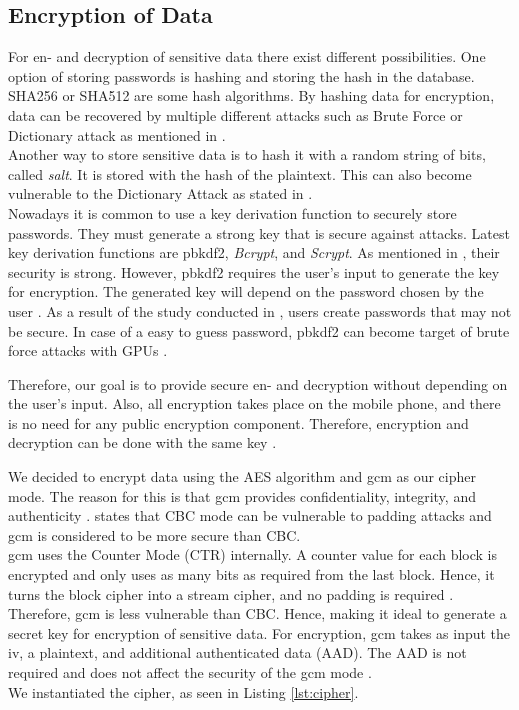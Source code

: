\subsection{Encryption of Data}\label{arch_encryption}
For en- and decryption of sensitive data there exist different possibilities. One option of storing passwords is hashing and storing the hash in the database. SHA256 or SHA512 are some hash algorithms. By hashing data for encryption, data can be recovered by multiple different attacks such as Brute Force or Dictionary attack as mentioned in \cite{ertaul2016implementation}. \\
Another way to store sensitive data is to hash it with a random string of bits, called \textit{salt}. It is stored with the hash of the plaintext. This can also become vulnerable to the Dictionary Attack as stated in \cite{3wrongways}. \\
Nowadays it is common to use a key derivation function to securely store passwords. They must generate a strong key that is secure against attacks. Latest key derivation functions are \gls{pbkdf2}, \textit{Bcrypt}, and \textit{Scrypt}. As mentioned in \cite{ertaul2016implementation}, their security is strong.
However, \gls{pbkdf2} requires the user's input to generate the key for encryption. The generated key will depend on the password chosen by the user \cite{Agilebits}. As a result of the study conducted in \cite{YanBAG04}, users create passwords that may not be secure. In case of a easy to guess password, \gls{pbkdf2} can become target of brute force attacks with GPUs \cite{DurmuthGKPYZ12}.

Therefore, our goal is to provide secure en- and decryption without depending on the user's input. Also, all encryption takes place on the mobile phone, and there is no need for any public encryption component. Therefore, encryption and decryption can be done with the same key \cite{ElminaamKH10}.

We decided to encrypt data using the AES algorithm and \gls{gcm} as our cipher mode. The reason for this is that \gls{gcm} provides confidentiality, integrity, and authenticity \cite{AESJavaAndroid}. \cite{GCMSecure} states that CBC mode can be vulnerable to padding attacks and \gls{gcm} is considered to be more secure than CBC. \\
\gls{gcm} uses the Counter Mode (CTR) internally. A counter value for each block is encrypted and only uses as many bits as required from the last block. Hence, it turns the block cipher into a stream cipher, and no padding is required \cite{IVtransmission}. Therefore, \gls{gcm} is less vulnerable than CBC. Hence, making it ideal to generate a secret key for encryption of sensitive data. For encryption, \gls{gcm} takes as input the \gls{iv}, a plaintext, and additional authenticated data (AAD). The AAD is not required and does not affect the security of the \gls{gcm} mode \cite{AADsecure}. \\
We instantiated the cipher, as seen in Listing \ref{lst:cipher}.

